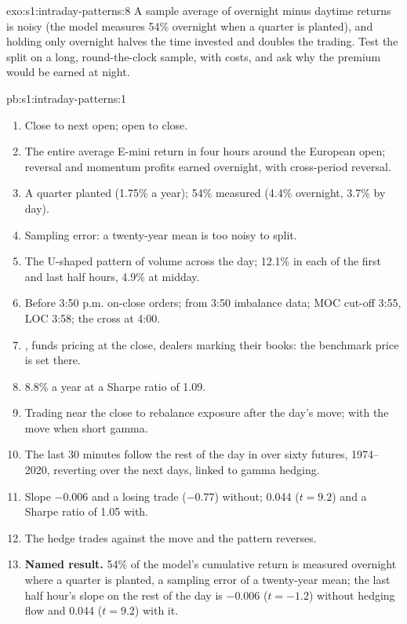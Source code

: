 \begin{solution}{exo:s1:intraday-patterns:8}
A sample average of overnight minus daytime returns is noisy (the model measures 54\% overnight when a quarter is planted), and holding only overnight
halves the time invested and doubles the trading. Test the split on a long, round-the-clock sample, with costs, and ask why the premium would be earned
at night.
\end{solution}

\begin{solution}{pb:s1:intraday-patterns:1}
\begin{enumerate}
\item Close to next open; open to close.
\item The entire average E-mini return in four hours around the European open; reversal and momentum profits earned overnight, with cross-period reversal.
\item A quarter planted (1.75\% a year); 54\% measured (4.4\% overnight, 3.7\% by day).
\item Sampling error: a twenty-year mean is too noisy to split.
\item The U-shaped pattern of volume across the day; 12.1\% in each of the first and last half hours, 4.9\% at midday.
\item Before 3:50 p.m. on-close orders; from 3:50 imbalance data; MOC cut-off 3:55, LOC 3:58; the cross at 4:00.
\item {}, funds pricing at the close, dealers marking their books: the benchmark price is set there.
\item 8.8\% a year at a Sharpe ratio of 1.09.
\item Trading near the close to rebalance exposure after the day's move; with the move when short gamma.
\item The last 30 minutes follow the rest of the day in over sixty futures, 1974--2020, reverting over the next days, linked to gamma hedging.
\item Slope $-0.006$ and a losing trade ($-0.77$) without; 0.044 ($t = 9.2$) and a Sharpe ratio of 1.05 with.
\item The hedge trades against the move and the pattern reverses.
\item \textbf{Named result.} 54\% of the model's cumulative return is measured overnight where a quarter is planted, a sampling error of a twenty-year mean;
the last half hour's slope on the rest of the day is $-0.006$ ($t = -1.2$) without hedging flow and 0.044 ($t = 9.2$) with it.

\end{enumerate}
\end{solution}
